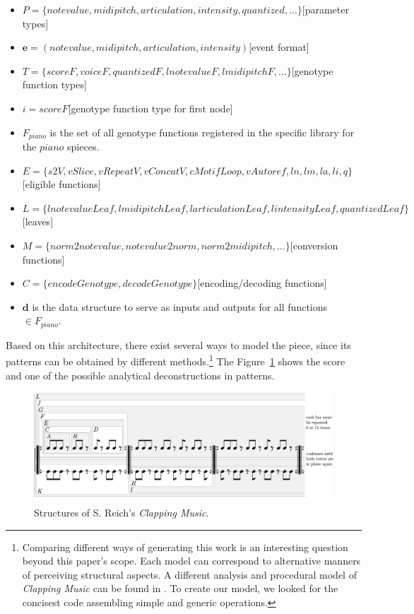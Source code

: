\documentclass{article}
\renewcommand{\vec}[1]{\mathbf{#1}}
\begin{document}
\begin{itemize}
\item $P = \{notevalue, midipitch, articulation, intensity, quantized, ...\}$\hfill[parameter types]
\item $\vec{e} = (notevalue, midipitch, articulation, intensity)$\hfill[event format] 
\item $T = \{scoreF, voiceF, quantizedF, lnotevalueF, lmidipitchF, ...\}$\hfill[genotype function types] 
\item $i = scoreF$\hfill[genotype function type for first node]
\item $F_{piano}$ is the set of all genotype functions registered in the specific library for the $piano$ spieces.
\item $E = \{s2V, vSlice, vRepeatV, vConcatV, cMotifLoop, vAutoref, ln, lm, la, li, q\}$\hfill[eligible functions]
\item $L = \{lnotevalueLeaf, lmidipitchLeaf, larticulationLeaf, lintensityLeaf, quantizedLeaf\}$\hfill[leaves]
\item $M = \{norm2notevalue, notevalue2norm, norm2midipitch, ...\}$\hfill[conversion functions]
\item $C = \{encodeGenotype, decodeGenotype\}$\hfill[encoding/decoding functions]
\item $\vec{d}$ is the data structure to serve as inputs and outputs for all functions $\in F_{piano}$.
\end{itemize}


Based on this architecture, there exist several ways to model the piece, since its patterns can be obtained by different methods.\footnote{Comparing different ways of generating this work is an interesting question beyond this paper's scope. Each model can correspond to alternative manners of perceiving structural aspects. A different analysis and procedural model of \emph{Clapping Music} can be found in \cite{MPS-manual}. To create our model, we looked for the concisest code assembling simple and generic operations.} The Figure~\ref{fig:clappingstruct} shows the score and one of the possible analytical deconstructions in patterns. 

\begin{figure}[H]
  \includegraphics[width=\linewidth]{figs/clapping_patterns.pdf}
  \caption{Structures of S. Reich's \emph{Clapping Music}.}
  \label{fig:clappingstruct}
\end{figure}
\end{document}
